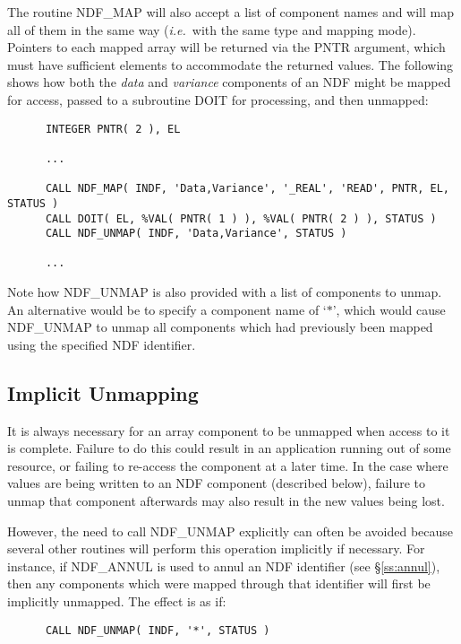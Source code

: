 \documentclass[twoside,11pt]{article}
\newcommand{\htmlref}[2]{#1}
\newcommand{\xlabel}[1]{}
\newcommand{\st}[1]{{\em{#1}}}
\begin{document}
The routine NDF\_MAP will also accept a list of component names and will map
all of them in the same way (\st{i.e.}\ with the same type and mapping mode). 
Pointers to each mapped array will be returned via the PNTR argument, which
must have sufficient elements to accommodate the returned values. 
The following shows how both the \st{data\/} and \st{variance\/} components of an
NDF  might be mapped for access, passed to a subroutine DOIT for processing, and
then unmapped: 

\small
\begin{verbatim}
      INTEGER PNTR( 2 ), EL

      ...

      CALL NDF_MAP( INDF, 'Data,Variance', '_REAL', 'READ', PNTR, EL, STATUS )
      CALL DOIT( EL, %VAL( PNTR( 1 ) ), %VAL( PNTR( 2 ) ), STATUS )
      CALL NDF_UNMAP( INDF, 'Data,Variance', STATUS )

      ...
\end{verbatim}
\normalsize

Note how NDF\_UNMAP is also provided with a list of components to unmap. 
An alternative would be to specify a component name of `$*$', which would
cause NDF\_UNMAP to unmap all components which had previously been mapped
using the specified NDF identifier. 

\subsection{\xlabel{implicit_unmapping}\label{ss:implicitunmapping}Implicit Unmapping}

It is always necessary for an array component to be unmapped when access to
it is complete.
Failure to do this could result in an application running out of some resource,
or failing to re-access the component at a later time. 
In the case where values are being written to an NDF component (described
below), failure to unmap that component afterwards may also result in the
new values being lost. 

However, the need to call \htmlref{NDF\_UNMAP}{NDF_UNMAP} explicitly can often be avoided because
several other routines will perform this operation implicitly if necessary. 
For instance, if \htmlref{NDF\_ANNUL}{NDF_ANNUL} is used to annul an NDF identifier (see
\S\ref{ss:annul}), then any components which were mapped through that
identifier will first be implicitly unmapped. 
The effect is as if:

\small
\begin{verbatim}
      CALL NDF_UNMAP( INDF, '*', STATUS )
\end{verbatim}
\normalsize
\end{document}
